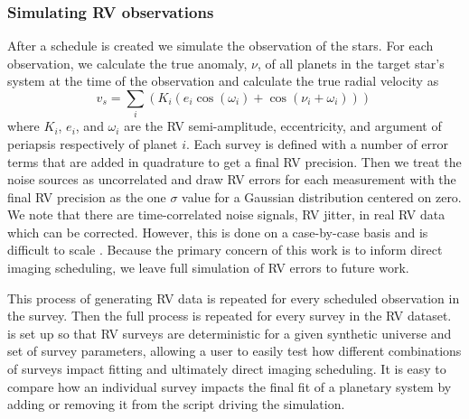 \subsubsection{Simulating RV observations}
After a schedule is created we simulate the observation of the stars. For each
observation, we calculate the true anomaly, $\nu$, of all planets in the target
star's system at the time of the observation and calculate the true radial
velocity as 
\begin{equation}
v_s = \sum_i \left(K_i \left(e_i
\cos(\omega_i) + \cos(\nu_i + \omega_i)\right)\right) \,
  \label{eq:system_rv}
\end{equation}
where $K_i$, $e_i$, and $\omega_i$ are the RV semi-amplitude, eccentricity, and
argument of periapsis respectively of planet $i$. Each survey is defined
with a number of error terms that are added in quadrature to get a final RV
precision. Then we treat the noise sources as uncorrelated and draw RV errors
for each measurement with the final RV precision as the one $\sigma$ value for
a Gaussian distribution centered on zero. We note that there are
time-correlated noise signals, RV jitter, in real RV data which can be
corrected. However, this is done on a case-by-case basis and is difficult to
scale \citep{guptaTargetPrioritization2021}. Because the primary concern of
this work is to inform direct imaging scheduling, we leave full simulation of
RV errors to future work.


This process of generating RV data is repeated for every scheduled observation in the
survey. Then the full process is repeated for every survey in the
RV dataset.  is set up so that RV surveys are deterministic
for a given synthetic universe and set of survey parameters, allowing a user to
easily test how different combinations of surveys impact fitting and
ultimately direct imaging scheduling. It is easy to compare how an individual
survey impacts the final fit of a planetary system by adding or removing
it from the script driving the simulation.

